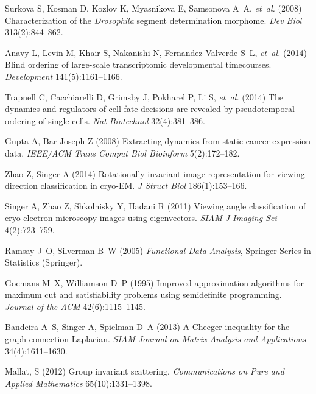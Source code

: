 \documentclass{pnastwo}
\begin{document}
\begin{article}
\begin{thebibliography}{10}
Surkova S, Kosman D, Kozlov K, Myasnikova E, Samsonova A~A, \textit{et~al.}
  (2008) Characterization of the \textit{{D}rosophila} segment determination
  morphome. \textit{Dev Biol} 313(2):844--862.

Anavy L, Levin M, Khair S, Nakanishi N, Fernandez-Valverde S~L, \textit{et~al.}
  (2014) Blind ordering of large-scale transcriptomic developmental
  timecourses. \textit{Development} 141(5):1161--1166.

Trapnell C, Cacchiarelli D, Grimsby J, Pokharel P, Li S, \textit{et~al.} (2014)
  The dynamics and regulators of cell fate decisions are revealed by
  pseudotemporal ordering of single cells. \textit{Nat Biotechnol} 32(4):381--386.

Gupta A, Bar-Joseph Z (2008) Extracting dynamics from static cancer expression
  data. \textit{IEEE/ACM Trans Comput Biol Bioinform} 5(2):172--182.

Zhao Z, Singer A (2014) Rotationally invariant image representation for
viewing direction classification in cryo-EM. \textit{J Struct Biol} 186(1):153--166.

Singer A, Zhao Z, Shkolnisky Y, Hadani R (2011) Viewing angle
classification of cryo-electron microscopy images using eigenvectors. \textit{SIAM J Imaging Sci} 4(2):723--759.


Ramsay J~O, Silverman B~W (2005) \textit{Functional Data Analysis}, Springer
  Series in Statistics (Springer).

Goemans M~X, Williamson D~P (1995) Improved approximation algorithms for maximum cut and satisfiability problems using semidefinite programming.
\textit{Journal of the ACM} 42(6):1115--1145.

Bandeira A~S, Singer A, Spielman D~A (2013) A Cheeger inequality for the graph connection Laplacian. \textit{SIAM Journal on Matrix Analysis and Applications} 34(4):1611--1630.

Mallat, S (2012) Group invariant scattering. 
\textit{Communications on Pure and Applied Mathematics}
65(10):1331--1398.


\end{thebibliography}
\end{article}
\end{document}
